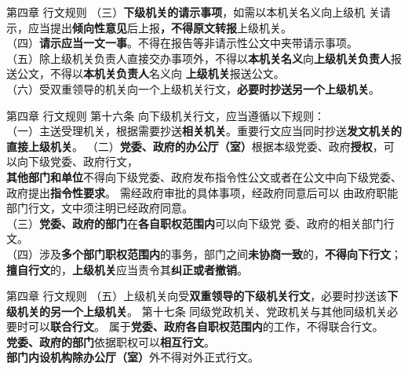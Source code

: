 \documentclass[aspectratio=169]{beamer}
\begin{document}
    \begin{frame}[t]{第四章 行文规则} \vspace{20pt}
        （三）\textbf{下级机关的请示事项}，如需以本机关名义向上级机
        关请示，应当提出\textbf{倾向性意见}后上报\textbf{，不得原文转报}上级机关。\\
        （四）\textbf{请示应当一文一事}。不得在报告等非请示性公文中夹带请示事项。\\
        （五）除上级机关负责人直接交办事项外，不得以\textbf{本机关名义}向\textbf{上级机关负责人}报送公文，不得以\textbf{本机关负责人}名义向
        \textbf{上级机关}报送公文。\\
        （六）受双重领导的机关向一个上级机关行文，\textbf{必要时抄送另一个上级机关}。

    \end{frame}



    \begin{frame}[t]{第四章 行文规则} \vspace{20pt}
        第十六条 向下级机关行文，应当遵循以下规则：\\
        （一）主送受理机关，根据需要抄送\textbf{相关机关}。重要行文应当同时抄送\textbf{发文机关的直接上级机关}。
        （二）\textbf{党委、政府的办公厅（室）}根据本级党委、政府\textbf{授权}，可以向下级党委、政府行文，\\
        \textbf{其他部门和单位}不得向下级党委、政府发布指令性公文或者在公文中向下级党委、政府提出\textbf{指令性要求}。
        需经政府审批的具体事项，经政府同意后可以
        由政府职能部门行文，文中须注明已经政府同意。\\
        （三）\textbf{党委、政府的部门}在\textbf{各自职权范围内}可以向下级党
        委、政府的相关部门行文。\\
        （四）涉及\textbf{多个部门职权范围内}的事务，部门之间\textbf{未协商一致}的，\textbf{不得向下行文}；
        \textbf{擅自行文}的，\textbf{上级机关}应当责令其\textbf{纠正或者撤销}。
    \end{frame}



    \begin{frame}[t]{第四章 行文规则} \vspace{20pt}
        （五）上级机关向受\textbf{双重领导的下级机关行文}，必要时抄送该\textbf{下级机关的另一个上级机关}。
        第十七条 同级党政机关、党政机关与其他同级机关必要时可以\textbf{联合行文}。
        属于\textbf{党委、政府各自职权范围内}的工作，不得联合行文。\\
        \textbf{党委、政府的部门}依据职权可以\textbf{相互行文}。\\
        \textbf{部门内设机构除办公厅（室）}外不得对外正式行文。\\
    \end{frame}
\end{document}
